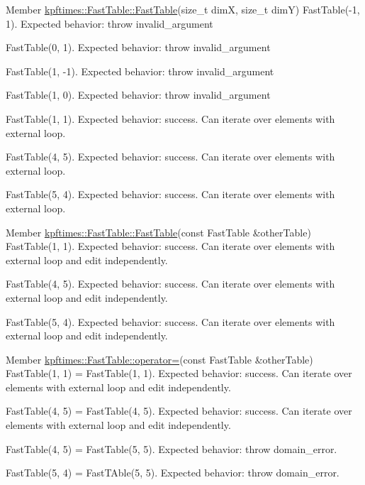 \begin{DoxyDescription}
\item[Member \hyperlink{classkpftimes_1_1_fast_table_ad3521d0b64b71f0ad53515a968592461}{kpftimes::FastTable::FastTable}(size\_\-t dimX, size\_\-t dimY) ]FastTable(-\/1, 1). Expected behavior: throw invalid\_\-argument 

FastTable(0, 1). Expected behavior: throw invalid\_\-argument 

FastTable(1, -\/1). Expected behavior: throw invalid\_\-argument 

FastTable(1, 0). Expected behavior: throw invalid\_\-argument 

FastTable(1, 1). Expected behavior: success. Can iterate over elements with external loop. 

FastTable(4, 5). Expected behavior: success. Can iterate over elements with external loop. 

FastTable(5, 4). Expected behavior: success. Can iterate over elements with external loop. 
\end{DoxyDescription}

\label{test__test000006}
\hypertarget{test__test000006}{}
 
\begin{DoxyDescription}
\item[Member \hyperlink{classkpftimes_1_1_fast_table_a7779e369693fcfb7b45fc80a95a1c0c6}{kpftimes::FastTable::FastTable}(const FastTable \&otherTable) ]FastTable(1, 1). Expected behavior: success. Can iterate over elements with external loop and edit independently. 

FastTable(4, 5). Expected behavior: success. Can iterate over elements with external loop and edit independently. 

FastTable(5, 4). Expected behavior: success. Can iterate over elements with external loop and edit independently. 
\end{DoxyDescription}

\label{test__test000007}
\hypertarget{test__test000007}{}
 
\begin{DoxyDescription}
\item[Member \hyperlink{classkpftimes_1_1_fast_table_a3495b0bccb0b5d165892a2fab5645dd7}{kpftimes::FastTable::operator=}(const FastTable \&otherTable) ]FastTable(1, 1) = FastTable(1, 1). Expected behavior: success. Can iterate over elements with external loop and edit independently. 

FastTable(4, 5) = FastTable(4, 5). Expected behavior: success. Can iterate over elements with external loop and edit independently. 

FastTable(4, 5) = FastTable(5, 5). Expected behavior: throw domain\_\-error. 

FastTable(5, 4) = FastTAble(5, 5). Expected behavior: throw domain\_\-error. 
\end{DoxyDescription}

